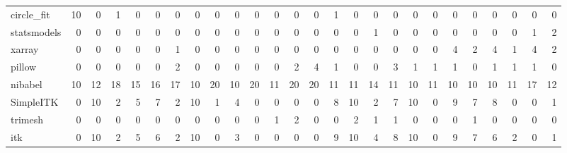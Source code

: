 \begin{tabular}{lrrrrrrrrrrrrrrrrrrrrrrrrr}
circle\_fit & 10 & 0 & 1 & 0 & 0 & 0 & 0 & 0 & 0 & 0 & 0 & 0 & 0 & 1 & 0 & 0 & 0 & 0 & 0 & 0 & 0 & 0 & 0 & 0 & 0 \\
statsmodels & 0 & 0 & 0 & 0 & 0 & 0 & 0 & 0 & 0 & 0 & 0 & 0 & 0 & 0 & 0 & 1 & 0 & 0 & 0 & 0 & 0 & 0 & 0 & 1 & 2 \\
xarray & 0 & 0 & 0 & 0 & 0 & 1 & 0 & 0 & 0 & 0 & 0 & 0 & 0 & 0 & 0 & 0 & 0 & 0 & 0 & 4 & 2 & 4 & 1 & 4 & 2 \\
pillow & 0 & 0 & 0 & 0 & 0 & 2 & 0 & 0 & 0 & 0 & 0 & 2 & 4 & 1 & 0 & 0 & 3 & 1 & 1 & 1 & 0 & 1 & 1 & 1 & 0 \\
nibabel & 10 & 12 & 18 & 15 & 16 & 17 & 10 & 20 & 10 & 20 & 11 & 20 & 20 & 11 & 11 & 14 & 11 & 10 & 11 & 10 & 10 & 10 & 11 & 17 & 12 \\
SimpleITK & 0 & 10 & 2 & 5 & 7 & 2 & 10 & 1 & 4 & 0 & 0 & 0 & 0 & 8 & 10 & 2 & 7 & 10 & 0 & 9 & 7 & 8 & 0 & 0 & 1 \\
trimesh & 0 & 0 & 0 & 0 & 0 & 0 & 0 & 0 & 0 & 0 & 1 & 2 & 0 & 0 & 2 & 1 & 1 & 0 & 0 & 0 & 1 & 0 & 0 & 0 & 0 \\
itk & 0 & 10 & 2 & 5 & 6 & 2 & 10 & 0 & 3 & 0 & 0 & 0 & 0 & 9 & 10 & 4 & 8 & 10 & 0 & 9 & 7 & 6 & 2 & 0 & 1 \\
\bottomrule
\end{tabular}
